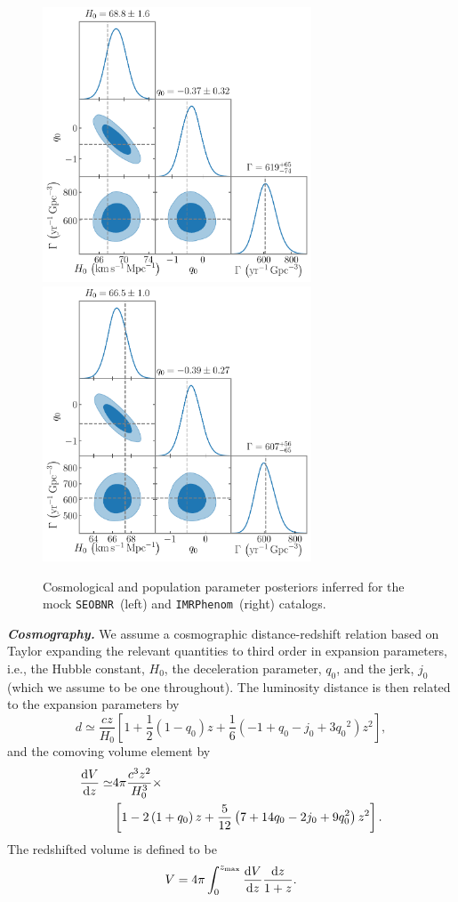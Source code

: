 \documentclass[%
 reprint,
 superscriptaddress,
 nofootinbib,
 amsmath,amssymb,
 aps,
]{revtex4-2}
\newcommand{\hubble}{\ensuremath{H_0}}
\newcommand{\decel}{\ensuremath{q_0}}
\newcommand{\jerk}{\ensuremath{j_0}}
\newcommand{\zmax}{\ensuremath{z_{\rm max}}}
\newcommand{\seobnr}{\texttt{SEOBNR}}
\newcommand{\imrp}{\texttt{IMRPhenom}}
\begin{document}
\begin{figure}[ht!]
\includegraphics[width=8cm]{fig_3a.pdf}\includegraphics[width=8cm]{fig_3b.pdf}
\caption{Cosmological and population parameter posteriors inferred for the mock \seobnr\ (left) and \imrp\ (right) catalogs.\label{fig:cosmo}}
\end{figure}

\textbf{\emph{Cosmography.}} We assume a cosmographic distance-redshift relation based on Taylor expanding the relevant quantities to third order in expansion parameters, i.e., the Hubble constant, \hubble, the deceleration parameter, \decel, and the jerk, $j_0$ (which we assume to be one throughout). The luminosity distance is then related to the expansion parameters by~\cite{Visser:2004}
\begin{equation}
d \simeq \frac{cz}{\hubble} \left[1 + \frac{1}{2} \left(1 - \decel \right) z + \frac{1}{6} \left(-1 + \decel - \jerk + 3 \decel^2 \right) z^2 \right],
\label{eq:distance}
\end{equation}
and the comoving volume element by
\begin{align}
\frac{{\rm d}V}{{\rm d}z} \simeq & 4\pi \frac{c^3 z^2}{\hubble^3} \times \label{eq:volel} \\
& \left[1 - 2 \left(1 + \decel \right) z + \frac{5}{12} \left(7 + 14 \decel - 2 \jerk + 9 \decel^2 \right) z^2 \right]. \nonumber
\end{align}
The redshifted volume is defined to be 
\begin{equation}
V = 4\pi \int_0^{\zmax} \frac{{\rm d}V}{{\rm d}z} \frac{{\rm d}z}{1+z}.
\label{eq:volume}
\end{equation}
\end{document}
